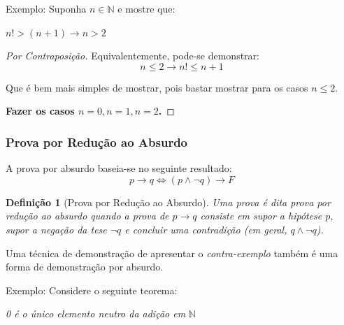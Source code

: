 \documentclass[oneside,a4paper,12pt]{article}
\newtheorem{definition}{Definição}[section]
\newtheorem{proof}{Demonstração}
\begin{document}
Exemplo:
Suponha $n \in \mathbb{N}$ e mostre que:
\begin{center}
	$n! > (n+1) \rightarrow n>2$
\end{center}

\begin{proof}[Por Contraposição]
Equivalentemente, pode-se demonstrar:
$$n \leq 2 \rightarrow n! \leq n+1$$

Que é bem mais simples de mostrar, pois bastar mostrar para os casos $n \leq 2$.

{\bf Fazer os casos $n=0, n=1, n=2$.}
\end{proof}

\subsubsection{Prova por Redução ao Absurdo}

A prova por absurdo baseia-se no seguinte resultado: $$p \rightarrow q \Leftrightarrow (p \land \neg q) \rightarrow F$$

\begin{definition}[Prova por Redução ao Absurdo]
	Uma prova é dita {\it prova por redução ao absurdo} quando a prova de $p \rightarrow q$ consiste em supor a hipótese $p$, supor a negação da tese $\neg q$ e concluir uma contradição (em geral, $q \land \neg q$).
\end{definition}

Uma técnica de demonstração de apresentar o {\it contra-exemplo} também é uma forma de demonstração por absurdo. 

Exemplo:
Considere o seguinte teorema:
\begin{center}
	{\it 0 é o único elemento neutro da adição em} $\mathbb{N}$
\end{center}
\end{document}
